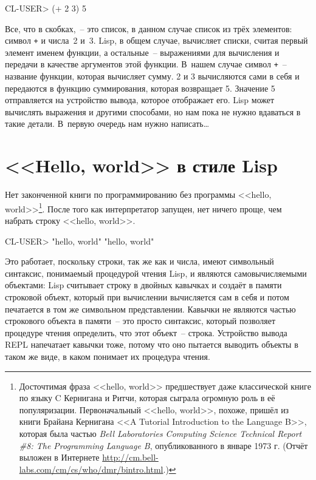 \begin{myverb}
CL-USER> (+ 2 3)
5
\end{myverb}

Все, что в скобках,~-- это список, в данном случае список из трёх элементов: символ \lstinline{+}
и числа~2 и~3. Lisp, в общем случае, вычисляет списки, считая первый элемент именем
функции, а остальные~-- выражениями для вычисления и передачи в качестве аргументов этой
функции. В~нашем случае символ \lstinline{+}~-- название функции, которая вычисляет сумму. 2 и 3
вычисляются сами в себя и передаются в функцию суммирования, которая возвращает
5. Значение 5 отправляется на устройство вывода, которое отображает его. Lisp может
вычислять выражения и другими способами, но нам пока не нужно вдаваться в такие детали.
В~первую очередь нам нужно написать\ldots

\section{<<Hello, world>> в стиле Lisp}

Нет законченной книги по программированию без программы <<hello,
world>>\footnote{Досточтимая фраза <<hello, world>> предшествует даже классической книге по
  языку C Кернигана и Ритчи, которая сыграла огромную роль в её
  популяризации. Первоначальный <<hello, world>>, похоже, пришёл из книги Брайана Кернигана <<A
  Tutorial Introduction to the Language B>>, которая была частью \emph{Bell Laboratories
  Computing Science Technical Report \#8: The Programming Language B}, опубликованного в
  январе 1973 г. (Отчёт выложен в Интернете
  \url{http://cm.bell-labs.com/cm/cs/who/dmr/bintro.html}.) }. После того как
интерпретатор запущен, нет ничего проще, чем набрать строку <<hello, world>>.

\begin{myverb}
CL-USER> "hello, world"
 "hello, world"
\end{myverb}

Это работает, поскольку строки, так же как и числа, имеют символьный синтаксис, понимаемый
процедурой чтения Lisp, и являются самовычисляемыми объектами: Lisp считывает строку в
двойных кавычках и создаёт в памяти строковой объект, который при вычислении вычисляется
сам в себя и потом печатается в том же символьном представлении.  Кавычки не являются
частью строкового объекта в памяти~-- это прос\-то синтаксис, который позволяет процедуре чтения
определить, что этот объект~-- строка. Устройство вывода REPL напечатает кавычки тоже,
потому что оно пытается выводить объекты в таком же виде, в каком понимает их процедура чтения.

